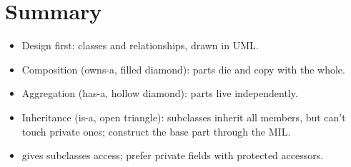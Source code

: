 \section*{Summary}
\begin{itemize}
  \item Design first: classes and relationships, drawn in UML.
  \item Composition (owns-a, filled diamond): parts die and copy with the whole.
  \item Aggregation (has-a, hollow diamond): parts live independently.
  \item Inheritance (is-a, open triangle): subclasses inherit all members, but
        can't touch private ones; construct the base part through the MIL.
  \item {} gives subclasses access; prefer private fields with
        protected accessors.
\end{itemize}
